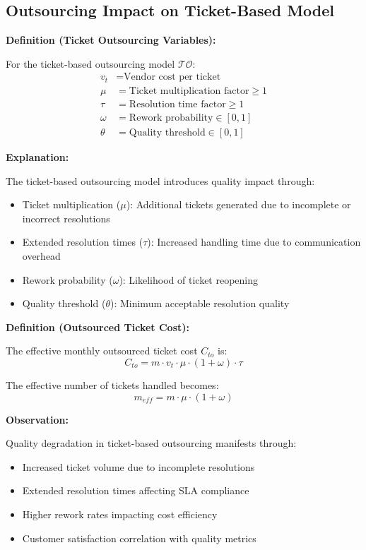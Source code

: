 \documentclass[12pt,a4paper]{article}
\newenvironment{definition}[1]
{\begin{mdframed}[style=definitionstyle]
\textbf{Definition (#1):}\par}
{\end{mdframed}}
\newenvironment{explanation}
{\begin{mdframed}[style=explanationstyle]
\textbf{Explanation:}\par}
{\end{mdframed}}
\newenvironment{observation}
{\begin{mdframed}[style=observationstyle]
\textbf{Observation:}\par}
{\end{mdframed}}
\begin{document}
\subsection{Outsourcing Impact on Ticket-Based Model}
\begin{definition}{Ticket Outsourcing Variables}
For the ticket-based outsourcing model $\mathcal{TO}$:
\begin{align*}
    v_t &= \text{Vendor cost per ticket} \\
    \mu &= \text{Ticket multiplication factor} \geq 1 \\
    \tau &= \text{Resolution time factor} \geq 1 \\
    \omega &= \text{Rework probability} \in [0,1] \\
    \theta &= \text{Quality threshold} \in [0,1]
\end{align*}
\end{definition}

\begin{explanation}
The ticket-based outsourcing model introduces quality impact through:
\begin{itemize}
    \item Ticket multiplication ($\mu$): Additional tickets generated due to incomplete or incorrect resolutions
    \item Extended resolution times ($\tau$): Increased handling time due to communication overhead
    \item Rework probability ($\omega$): Likelihood of ticket reopening
    \item Quality threshold ($\theta$): Minimum acceptable resolution quality
\end{itemize}
\end{explanation}

\begin{definition}{Outsourced Ticket Cost}
The effective monthly outsourced ticket cost $C_{to}$ is:
\begin{equation}
    C_{to} = m \cdot v_t \cdot \mu \cdot (1 + \omega) \cdot \tau
\end{equation}

The effective number of tickets handled becomes:
\begin{equation}
    m_{eff} = m \cdot \mu \cdot (1 + \omega)
\end{equation}
\end{definition}

\begin{observation}
Quality degradation in ticket-based outsourcing manifests through:
\begin{itemize}
    \item Increased ticket volume due to incomplete resolutions
    \item Extended resolution times affecting SLA compliance
    \item Higher rework rates impacting cost efficiency
    \item Customer satisfaction correlation with quality metrics
\end{itemize}
\end{observation}
\end{document}
